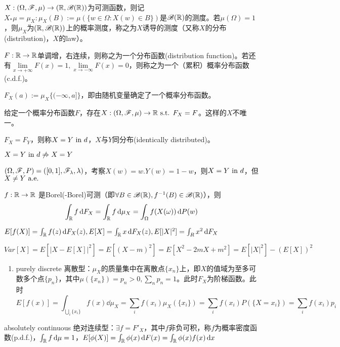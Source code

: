\documentclass{ctexbook}
\begin{document}
\begin{Eg}
  $X:(\Omega,\mathscr{F},\mu)\to(\mathbb{R},\mathscr{B}(\mathbb{R}))$为可测函数，则记$X_{*}\mu=\mu_{X}:\mu_{X}(B):=\mu(\{w\in\Omega:X(w)\in B\})$是$\mathscr{B}(\mathbb{R})$的测度。若$\mu(\Omega)=1$，则$\mu_{X}$为$(\mathbb{R},\mathscr{B}(\mathbb{R}))$上的概率测度，称之为$X$诱导的测度（又称$X$的分布(distribution)，$X$的law）。
\end{Eg}

\begin{Def}
  $F:\mathbb{R}\to\mathbb{R}$单调增，右连续，则称之为一个分布函数(distribution function)。若还有$\lim\limits_{x\to +\infty}F(x)=1,\lim\limits_{x\to -\infty}F(x)=0$，则称之为一个（累积）概率分布函数(c.d.f.)。

$F_{X}(a):=\mu_{X}\{(-\infty,a]\}$，即由随机变量确定了一个概率分布函数。
\end{Def}

\begin{Rmk}
  给定一个概率分布函数$F$，存在$X:(\Omega,\mathscr{F},\mu)\to\mathbb{R}\text{ s.t. } F_{X}=F$。这样的$X$不唯一。
\end{Rmk}

\begin{Def}
  $F_{X}=F_{Y}$，则称$X=Y\text{ in } d$，$X$与$Y$同分布(identically distributed)。
\end{Def}

$X=Y\text{ in } d\not\Rightarrow X=Y$
\begin{Eg}
  $(\Omega,\mathscr{F},P)=([0,1],\mathscr{F}_{\lambda},\lambda)$，考察$X(w)=w.Y(w)=1-w$，则$X=Y\text{ in } d$，但$X\neq Y\text{ a.e. }$
\end{Eg}

\begin{Thm}
  $f:\mathbb{R}\to\mathbb{R}$ 是Borel(-Borel)可测（即$\forall B\in \mathscr{B}(\mathbb{R}),f^{-1}(B)\in\mathscr{B}(\mathbb{R})$），则
  \[\int_{\mathbb{R}}f\,\mathrm{d} F_{X}=\int_{\mathbb{R}}f\,\mathrm{d}\mu_{X} =\int_{\Omega}f(X(\omega))\,\mathrm{d} P(w)\]
\end{Thm}

\begin{Eg}
  $E[f(X)]=\int_{\mathbb{R}}f(z)\,\mathrm{d} F_{X}(z), E[X]=\int_{\mathbb{R}}x\,\mathrm{d} F_{X}(z), E[|X|^{2}]=\int_{R}x^{2}\,\mathrm{d} F_{X}$

  $Var[X]=E[|X-E[X]|^{2}]=E[(X-m)^{2}]=E[X^{2}-2mX+m^{2}]=E[|X|^{2}]-(E[X])^{2}$
\end{Eg}

\begin{Eg}
  \begin{enumerate}
  \item purely discrete 离散型：$\mu_{X}$的质量集中在离散点$\{x_{n}\}$上，即$X$的值域为至多可数多个点$\{p_{n}\}$，其中$\mu(\{x_{n}\})=p_{n}>0,\sum_{n}p_{n}=1$。此时$F_{X}$为阶梯函数。此时
    \[E[f(x)]=\int_{\bigcup_{i}\{x_{i}\}}f(x)\dd\mu_{X}=\sum_{i}f(x_{i})\mu_{X}(\{x_{i}\})=\sum_{i}f(x_{i})P(\{X=x_{i}\})=\sum_{i}f(x_{i})p_{i}\]
  \end{enumerate}
\item absolutely continuous 绝对连续型：$\exists f=F'_{X}$，其中$f$非负可积，称$f$为概率密度函数(p.d.f.)，$\int_{\mathbb{R}}f\,\mathrm{d}\mu=1$，$E[\phi(X)]=\int_{\mathbb{R}}\phi(x)\,\mathrm{d} F(x)=\int_{\mathbb{R}}\phi(x)f(x)\,\mathrm{d} x$
\end{Eg}
\end{document}
